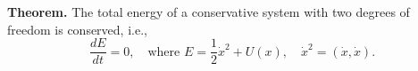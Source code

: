 \textbf{Theorem.} The total energy of a conservative system with two degrees of freedom is conserved, i.e.,
$$\frac{dE}{dt} = 0, \quad \text{where } E = \frac{1}{2} \dot{x}^2 + U(x), \quad \dot{x}^2 = (\dot{x}, \dot{x}).$$
